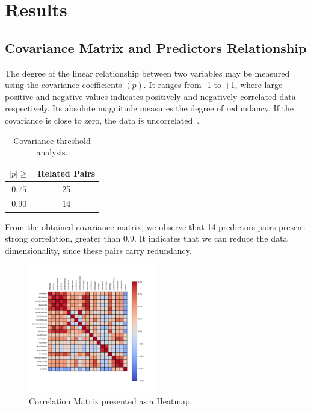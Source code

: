 
\section{Results}

\subsection{Covariance Matrix and Predictors Relationship}
The degree of the linear relationship between two variables may be measured using the covariance coefficients $(p)$. It ranges from -1 to +1, where large positive and negative values indicates positively and negatively correlated data respectively. Its absolute magnitude measures the degree of redundancy. If the covariance is close to zero, the data is uncorrelated~\cite{Kuhn2013}.

\begin{table}[htbp]
  \caption{Covariance threshold analysis.}
  \begin{center}
  \begin{tabular}{|c|c|}
          \hline 
          $|p| \geq$ & Related Pairs\\
          \hline
          $0.75$ & 25\\
          \hline
          $0.90$ & 14 \\
          \hline
  \end{tabular}
\label{tab:Covariance}
\end{center}
\end{table}

From the obtained covariance matrix, we observe that 14 predictors pairs present strong correlation, greater than 0.9. It indicates that we can reduce the data dimensionality, since these pairs carry redundancy.

\begin{figure}[htbp!]
  \centerline{\includegraphics[width=0.5\textwidth]{../../code/hw2/figures/1-correlation_matrix.pdf}}
  \caption{Correlation Matrix presented as a Heatmap.}
  \label{fig:1-correlation_matrix}
\end{figure}


